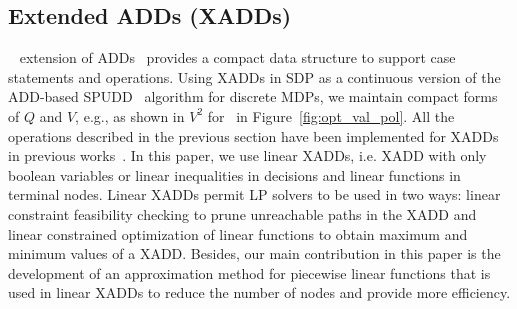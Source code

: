 \subsection {\bf Extended ADDs (XADDs)}
~\cite{sanner_uai11} extension of
ADDs~\cite{bahar93add} provides a compact data structure to support
case statements and operations.  Using XADDs in SDP as a continuous
version of the ADD-based SPUDD~\cite{spudd} algorithm for
discrete MDPs, we maintain compact forms of $Q$ and $V$, e.g., as
shown in $V^2$ for \MarsRover\ in Figure~\ref{fig:opt_val_pol}.  All the operations described in the previous section have been implemented for XADDs in previous works~\cite{sanner_uai11}. In this paper, we use linear XADDs, i.e. XADD with only boolean variables or linear inequalities in decisions and linear functions in terminal nodes. Linear XADDs permit LP solvers to be used in two ways: linear constraint feasibility checking to prune unreachable paths in the XADD and linear constrained optimization of linear functions to obtain maximum and minimum values of a XADD. Besides, our main contribution in this paper is the development of an approximation method for piecewise linear functions that is used in linear XADDs to reduce the number of nodes and provide more efficiency.